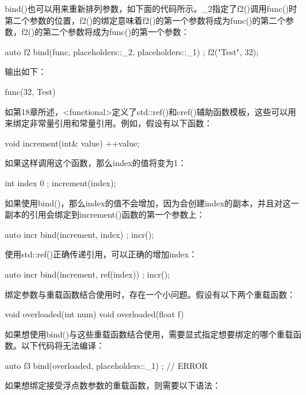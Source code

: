 bind()也可以用来重新排列参数，如下面的代码所示。\_2指定了f2()调用func()时第二个参数的位置，f2()的绑定意味着f2()的第一个参数将成为func()的第二个参数，f2()的第二个参数将成为func()的第一个参数：

\begin{cpp}
auto f2 { bind(func, placeholders::_2, placeholders::_1) };
f2("Test", 32);
\end{cpp}

输出如下：

\begin{shell}
func(32, Test)
\end{shell}

如第18章所述，<functional>定义了std::ref()和cref()辅助函数模板，这些可以用来绑定非常量引用和常量引用。例如，假设有以下函数：

\begin{cpp}
void increment(int& value) { ++value; }
\end{cpp}

如果这样调用这个函数，那么index的值将变为1：

\begin{cpp}
int index { 0 };
increment(index);
\end{cpp}

如果使用bind()，那么index的值不会增加，因为会创建index的副本，并且对这一副本的引用会绑定到increment()函数的第一个参数上：

\begin{cpp}
auto incr { bind(increment, index) };
incr();
\end{cpp}

使用std::ref()正确传递引用，可以正确的增加index：

\begin{cpp}
auto incr { bind(increment, ref(index)) };
incr();
\end{cpp}

绑定参数与重载函数结合使用时，存在一个小问题。假设有以下两个重载函数：

\begin{cpp}
void overloaded(int num) {}
void overloaded(float f) {}
\end{cpp}

如果想使用bind()与这些重载函数结合使用，需要显式指定想要绑定的哪个重载函数。以下代码将无法编译：

\begin{cpp}
auto f3 { bind(overloaded, placeholders::_1) }; // ERROR
\end{cpp}

如果想绑定接受浮点数参数的重载函数，则需要以下语法：

